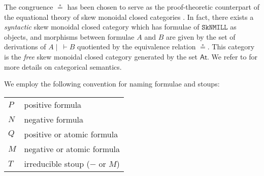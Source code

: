 \documentclass[runningheads]{llncs}
\newcommand{\lf}{\dn_\mathsf{lf}}%
\newcommand{\SkNMILL}{\texttt{SkNMILL}}
\newcommand{\up}{\Uparrow}
\newcommand{\dn}{\Downarrow}
\newcommand{\At}{\mathsf{At}}
\begin{document}
The congruence $\circeq$ has been chosen to serve as the proof-theoretic counterpart of the equational theory of skew monoidal closed categories \cite{street:skew-closed:2013}.
In fact, there exists a \emph{syntactic} skew monoidal closed category which has formulae of $\SkNMILL$ as objects, and morphisms between formulae $A$ and $B$ are given by the set of derivations of $A \mid ~ \vdash B$ quotiented by the equivalence relation $\circeq$. This category is the \emph{free} skew monoidal closed category generated by the set $\At$. We refer to \cite{UVW:protsn} for more details on categorical semantics.

We employ the following convention for naming formulae and stoups:
\begin{center}
  \begin{tabular}{|@{\;}l@{\qquad}l@{\;}|}
    \hline
  $P$ & positive formula \\
  $N$ & negative formula\\
  $Q$ & positive or atomic formula \\
  $M$ & negative or atomic formula \\
    $T$ & irreducible stoup ($-$ or $M$)\\ \hline
\end{tabular}
    \end{center}

\end{document}

